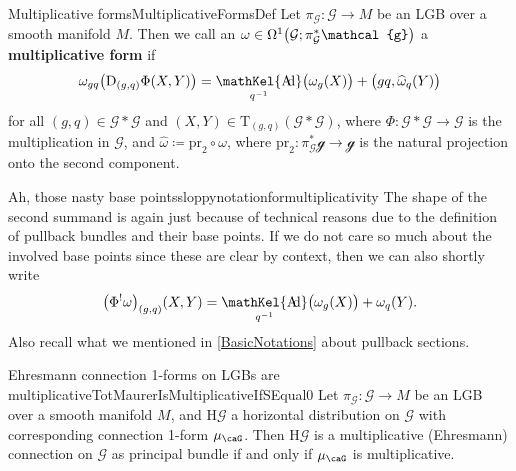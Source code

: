 \documentclass[reqno,a4paper,oneside]{amsart}
\newcommand\mutot{\mu_\caG}
\theoremstyle{plain}
\theoremstyle{remark}
\theoremstyle{definition}
\DeclareMathOperator{\sAd}{\mathKel{A\mkern-5.5mu d}}
\begin{document}
\begin{definitions}{Multiplicative forms}{MultiplicativeFormsDef}
Let $\pi_{\mathcal{G}} \colon \mathcal{G} \to M$ be an LGB over a smooth manifold $M$. Then we call an $\omega \in \Omega^1\mleft( \mathcal{G}; \pi_{\mathcal{G}}^*\mathcal{g} \mright)$ a \textbf{multiplicative form} if
\begin{equation*}
\omega_{gq}\mleft( \mathrm{D}_{(g, q)}\Phi(X, Y)  \mright)
=
\sAd_{q^{-1}}\bigl( \omega_{g}(X) \bigr)
	+ \bigl( gq, \widehat{\omega}_{q}(Y) \bigr)
\end{equation*}
for all $(g, q) \in \mathcal{G}*\mathcal{G}$ and $(X, Y) \in \mathrm{T}_{(g, q)}(\mathcal{G}*\mathcal{G})$,
where $\Phi\colon \mathcal{G} * \mathcal{G} \to \mathcal{G}$ is the multiplication in $\mathcal{G}$, and $\widehat{\omega} \coloneqq \mathrm{pr}_2 \circ \omega$, where $\mathrm{pr}_2\colon \pi_{\mathcal{G}}^*\mathcal{g} \to \mathcal{g}$ is the natural projection onto the second component.
\end{definitions}

\begin{remarks}{Ah, those nasty base points}{sloppynotationformultiplicativity}
The shape of the second summand is again just because of technical reasons due to the definition of pullback bundles and their base points. If we do not care so much about the involved base points since these are clear by context, then we can also shortly write
\begin{equation*}
\mleft(\Phi^!\omega\mright)_{(g, q)}(X, Y)
=
\sAd_{q^{-1}}\bigl( \omega_{g}(X) \bigr)
	+ \omega_{q}(Y).
\end{equation*}
Also recall what we mentioned in \ref{BasicNotations} about pullback sections.
\end{remarks}

\begin{propositions}{Ehresmann connection 1-forms on LGBs are multiplicative}{TotMaurerIsMultiplicativeIfSEqual0}
Let $\pi_{\mathcal{G}} \colon \mathcal{G} \to M$ be an LGB over a smooth manifold $M$, and $\mathrm{H}\mathcal{G}$ a horizontal distribution on $\mathcal{G}$ with corresponding connection 1-form $\mutot$. Then $\mathrm{H}\mathcal{G}$ is a multiplicative (Ehresmann) connection on $\mathcal{G}$ as principal bundle if and only if $\mutot$ is multiplicative.
\end{propositions}
\end{document}
